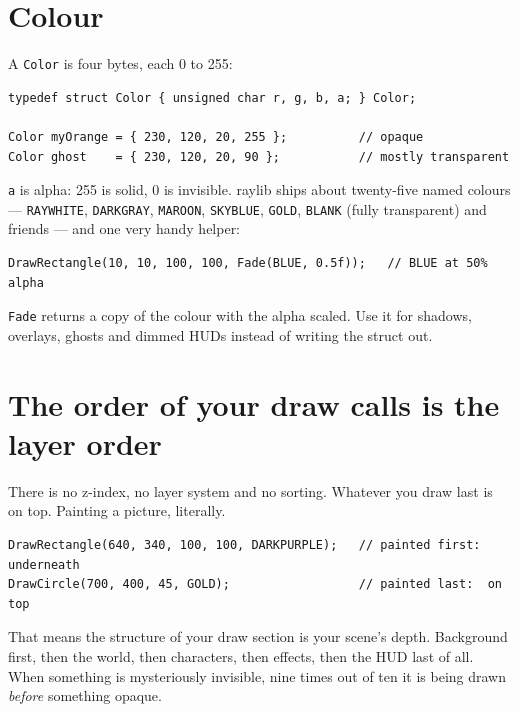 \section{Colour}

A \lstinline|Color| is four bytes, each 0 to 255:

\begin{lstlisting}
typedef struct Color { unsigned char r, g, b, a; } Color;

Color myOrange = { 230, 120, 20, 255 };          // opaque
Color ghost    = { 230, 120, 20, 90 };           // mostly transparent
\end{lstlisting}

\lstinline|a| is alpha: 255 is solid, 0 is invisible. raylib ships about
twenty-five named colours --- \lstinline|RAYWHITE|, \lstinline|DARKGRAY|,
\lstinline|MAROON|, \lstinline|SKYBLUE|, \lstinline|GOLD|, \lstinline|BLANK|
(fully transparent) and friends --- and one very handy helper:

\begin{lstlisting}
DrawRectangle(10, 10, 100, 100, Fade(BLUE, 0.5f));   // BLUE at 50% alpha
\end{lstlisting}

\lstinline|Fade| returns a copy of the colour with the alpha scaled. Use it for
shadows, overlays, ghosts and dimmed HUDs instead of writing the struct out.


\section{The order of your draw calls is the layer order}

There is no z-index, no layer system and no sorting. Whatever you draw last is
on top. Painting a picture, literally.

\begin{lstlisting}
DrawRectangle(640, 340, 100, 100, DARKPURPLE);   // painted first: underneath
DrawCircle(700, 400, 45, GOLD);                  // painted last:  on top
\end{lstlisting}

That means the structure of your draw section is your scene's depth. Background
first, then the world, then characters, then effects, then the HUD last of all.
When something is mysteriously invisible, nine times out of ten it is being drawn
\emph{before} something opaque.

